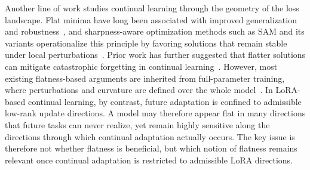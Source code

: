 \documentclass[10pt]{article} %
\begin{document}
Another line of work studies continual learning through the geometry of the loss landscape. Flat minima have long been associated with improved generalization and robustness~\cite{FlatMinima1997,wu2017understandinggeneralizationdeeplearning,chaudhariEntropySGDBiasingGradient2019,NEURIPS2020_518a38cc,NEURIPS2021_995f5e03,JMLRAnEmpiricalInvestigatio,yangRevisitingFlatnessAwareOptimization2025}, and sharpness-aware optimization methods such as SAM and its variants operationalize this principle by favoring solutions that remain stable under local perturbations~\cite{foretSharpnessAwareMinimizationEfficiently2021,pmlr-v151-bisla22a,Zhang_GAM,NEURIPS2024_C-Flat}. Prior work has further suggested that flatter solutions can mitigate catastrophic forgetting in continual learning~\cite{NEURIPS2020_518a38cc,JMLRAnEmpiricalInvestigatio,shiOvercomingCatastrophicForgetting2021,liRevisitingCatastrophicForgetting2024}. However, most existing flatness-based arguments are inherited from full-parameter training, where perturbations and curvature are defined over the whole model~\cite{li2024flatlora}. In LoRA-based continual learning, by contrast, future adaptation is confined to admissible low-rank update directions. A model may therefore appear flat in many directions that future tasks can never realize, yet remain highly sensitive along the directions through which continual adaptation actually occurs. The key issue is therefore not whether flatness is beneficial, but which notion of flatness remains relevant once continual adaptation is restricted to admissible LoRA directions.





\end{document}
